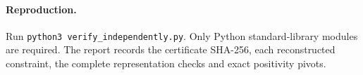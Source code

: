 \documentclass[11pt]{article}
\begin{document}
\paragraph{Reproduction.}
Run \texttt{python3 verify\_independently.py}. Only Python standard-library modules are required. The report records the certificate SHA-256, each reconstructed constraint, the complete representation checks and exact positivity pivots.
\end{document}
